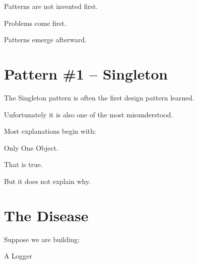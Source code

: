 \documentclass[11pt,a4paper]{book}
\begin{document}
\begin{rosettarule}

Patterns are not invented first.


Problems come first.


Patterns emerge afterward.

\end{rosettarule}
\section{Pattern \#1 -- Singleton}

The Singleton pattern is often
the first design pattern learned.


Unfortunately it is also one of
the most misunderstood.


Most explanations begin with:


Only One Object.


That is true.


But it does not explain why.


\section{The Disease}

Suppose we are building:


A Logger

\end{document}
